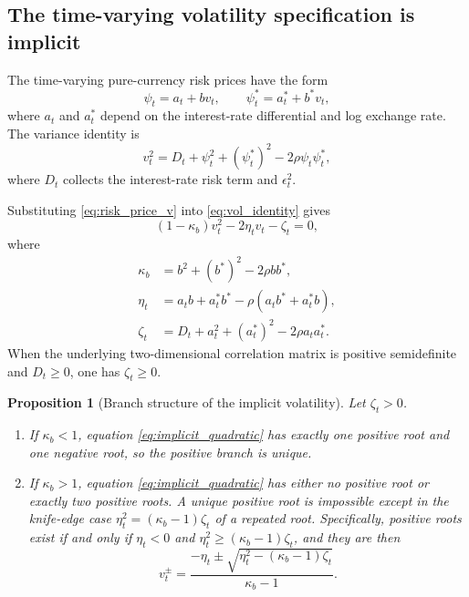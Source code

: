 \documentclass[11pt]{article}
\newtheorem{proposition}{Proposition}
\theoremstyle{definition}
\begin{document}
\subsection{The time-varying volatility specification is implicit}

The time-varying pure-currency risk prices have the form
\begin{equation}\label{eq:risk_price_v}
\psi_t=a_t+bv_t,
\qquad
\psi_t^*=a_t^*+b^*v_t,
\end{equation}
where $a_t$ and $a_t^*$ depend on the interest-rate differential and log exchange rate. The variance identity is
\begin{equation}\label{eq:vol_identity}
v_t^2
=D_t+\psi_t^2+(\psi_t^*)^2-2\rho\psi_t\psi_t^*,
\end{equation}
where $D_t$ collects the interest-rate risk term and $\epsilon_t^2$.

Substituting \eqref{eq:risk_price_v} into \eqref{eq:vol_identity} gives
\begin{equation}\label{eq:implicit_quadratic}
(1-\kappa_b)v_t^2-2\eta_t v_t-\zeta_t=0,
\end{equation}
where
\begin{align}
\kappa_b&=b^2+(b^*)^2-2\rho bb^*, \label{eq:kappa_b}\\
\eta_t&=a_tb+a_t^*b^*-\rho(a_tb^*+a_t^*b),\\
\zeta_t&=D_t+a_t^2+(a_t^*)^2-2\rho a_ta_t^*.
\end{align}
When the underlying two-dimensional correlation matrix is positive semidefinite and $D_t\ge0$, one has $\zeta_t\ge0$.

\begin{proposition}[Branch structure of the implicit volatility]\label{prop:vol_branch}
Let $\zeta_t>0$.
\begin{enumerate}[label=(\roman*)]
\item If $\kappa_b<1$, equation \eqref{eq:implicit_quadratic} has exactly one positive root and one negative root, so the positive branch is unique.
\item If $\kappa_b>1$, equation \eqref{eq:implicit_quadratic} has either no positive root or exactly two positive roots. A unique positive root is impossible except in the knife-edge case $\eta_t^2=(\kappa_b-1)\zeta_t$ of a repeated root. Specifically, positive roots exist if and only if $\eta_t<0$ and $\eta_t^2\ge(\kappa_b-1)\zeta_t$, and they are then
\[
v_t^{\pm}=\frac{-\eta_t\pm\sqrt{\eta_t^2-(\kappa_b-1)\zeta_t}}{\kappa_b-1}.
\]
\end{enumerate}
\end{proposition}
\end{document}
